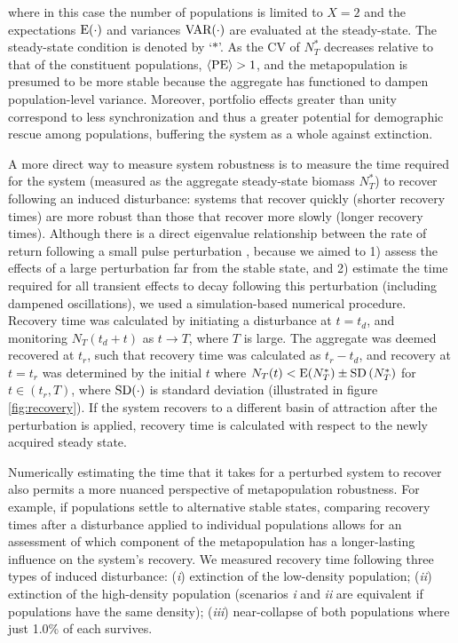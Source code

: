 \documentclass{revtex4}
\begin{document}
\noindent where in this case the number of populations is limited to $X=2$ and the expectations $\rm E(\cdot)$ and variances $\rm VAR(\cdot)$ are evaluated at the steady-state.
The steady-state condition is denoted by `$*$'.
As the CV of $N_T^*$ decreases relative to that of the constituent populations, $\langle{\rm PE}\rangle > 1$, and the metapopulation is presumed to be more stable because the aggregate has functioned to dampen population-level variance.
Moreover, portfolio effects greater than unity correspond to less synchronization  \citep{Loreau:2008ju,Anderson:2014cx,Yeakel:2013vz} and thus a greater potential for demographic rescue among populations, buffering the system as a whole against extinction. 

A more direct way to measure system robustness is to measure the time required for the system (measured as the aggregate steady-state biomass $N_T^*$) to recover following an induced disturbance: systems that recover quickly (shorter recovery times) are more robust than those that recover more slowly (longer recovery times).
Although there is a direct eigenvalue relationship between the rate of return following a small pulse perturbation \citep{GuckHolmes}, because we aimed to 
1) assess the effects of a large perturbation far from the stable state, and 
2) estimate the time required for all transient effects to decay following this perturbation (including dampened oscillations), we used a simulation-based numerical procedure.
Recovery time was calculated by initiating a disturbance at $t=t_d$, and monitoring $N_T(t_d+t)$ as $t\rightarrow T$, where $T$ is large. 
The aggregate was deemed recovered at $t_r$, such that recovery time was calculated as $t_r-t_d$, and recovery at $t=t_r$ was determined by the initial $t$ where $N_T(t) < {\rm E}(N_T^*)\pm{\rm SD}\left( N_T^* \right)$ for $t\in(t_r,T)$, where $\rm{SD}(\cdot)$ is standard deviation (illustrated in figure \ref{fig:recovery}).
If the system recovers to a different basin of attraction after the perturbation is applied, recovery time is calculated with respect to the newly acquired steady state.

Numerically estimating the time that it takes for a perturbed system to recover also permits a more nuanced perspective of metapopulation robustness.
For example, if populations settle to alternative stable states, comparing recovery times after a disturbance applied to individual populations allows for an assessment of which component of the metapopulation has a longer-lasting influence on the system's recovery.
We measured recovery time following three types of induced disturbance: (\emph{i}) extinction of the low-density population; (\emph{ii}) extinction of the high-density population (scenarios \emph{i} and \emph{ii} are equivalent if populations have the same density); (\emph{iii}) near-collapse of both populations where just 1.0\% of each survives.
\\
\end{document}
